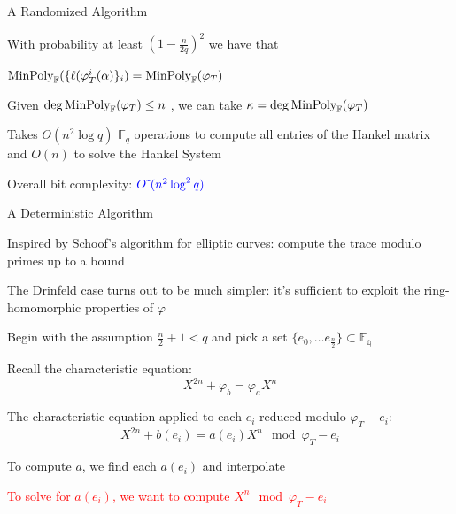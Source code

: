\documentclass{beamer}
\newcommand{\minpol}{\textnormal{MinPoly}_{\mathbb{F}}}
\newcommand{\f}{\mathbb{F}}
\newcommand{\blue}{\textcolor{blue}}
\newcommand{\red}{\textcolor{red}}
\begin{document}
\begin{frame}{A Randomized Algorithm}


    \item  With probability at least $(1 - \frac{n}{2q})^2$ we have that \item \centerline{$\minpol(\{\ell(\varphi_T^i(\alpha)\}_i) = \minpol(\varphi_T)$}
    
    \item Given $\deg \minpol(\varphi_T) \leq n$ , we can take $\kappa = \deg \minpol(\varphi_T)$

        \item Takes $O(n^2 \log q)$ $\f_q$ operations to compute all entries of the Hankel matrix and $O(n)$ to solve the Hankel System
    \item Overall bit complexity: $\blue{O\tilde{~}(n^2 \log^2 q)}$

\end{frame}


\begin{frame}{A Deterministic Algorithm}


    \item Inspired by Schoof's algorithm for elliptic curves: compute the trace modulo primes up to a bound
    \item The Drinfeld case turns out to be much simpler: it's sufficient to exploit the ring-homomorphic properties of $\varphi$
    \item Begin with the assumption $ \frac{n}{2} + 1 < q$ and pick a set $\{e_0, \ldots e_{\frac{n}{2}}\} \subset \mathbb{F_q}$
    \item Recall the characteristic equation:
    \[X^{2n} + \varphi_b = \varphi_a X^n\]
    \item The characteristic equation applied to each $e_i$ reduced modulo $\varphi_{T} - e_i$:
    \[ X^{2n} + b(e_i) = a(e_i) X^n  \mod \varphi_{T} - e_i \]
    \item To compute $a$, we find each $a(e_i)$ and interpolate
    \item \red{To solve for $a(e_i)$, we want to compute $X^n \mod \varphi_{T} - e_i$}

    
\end{frame}
\end{document}
